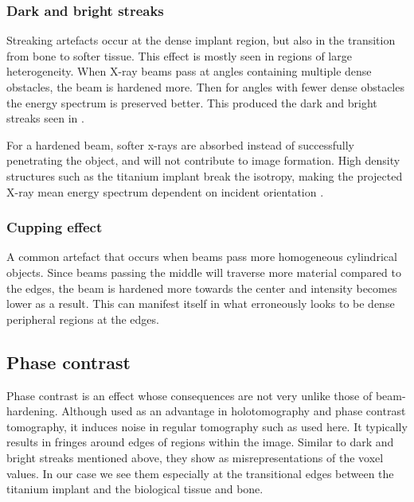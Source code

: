 \subsubsection{Dark and bright streaks}

Streaking artefacts occur at the dense implant region, but also in the transition from bone to softer
tissue. This effect is mostly seen in regions of large heterogeneity. When X-ray beams pass at angles
containing multiple dense obstacles, the beam is hardened more. Then for angles with fewer dense
obstacles the energy spectrum is preserved better. This produced the dark and bright streaks seen in
.

For a hardened beam, softer x-rays are absorbed instead of successfully penetrating the object,
and will not contribute to image formation. High density structures such as the titanium implant
break the isotropy, making the projected X-ray mean energy spectrum dependent on incident orientation
\citep{srnoise}.

\subsubsection{Cupping effect}

A common artefact that occurs when beams pass more homogeneous cylindrical objects. Since beams
passing the middle will traverse more material compared to the edges, the beam is hardened more
towards the center and intensity becomes lower as a result. This can manifest itself in what
erroneously looks to be dense peripheral regions at the edges.

\subsection{Phase contrast}

Phase contrast is an effect whose consequences are not very unlike those of beam-hardening.
Although used as an advantage in holotomography\citep{holotomography} and phase contrast tomography\citep{phasecontrast},
it induces noise in regular tomography such as used here. It typically results in fringes around edges
of regions within the image\citep{srnoise}. Similar to dark and bright streaks mentioned above,
they show as misrepresentations of the voxel values. In our case we see them especially at the
transitional edges between the titanium implant and the biological tissue and bone.


